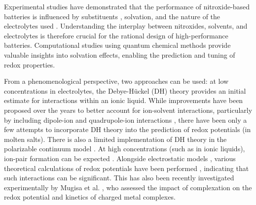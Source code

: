 \documentclass[review,preprint]{elsarticle}
\begin{document}
Experimental studies have demonstrated that the performance of nitroxide-based batteries is influenced by substituents \cite{sugaCathodeAnodeActivePoly2007}, solvation, and the nature of the electrolytes used \cite{armandIonicliquidMaterialsElectrochemical2009,strehmelRadicalsIonicLiquids2012,wylieIncreasedStabilityNitroxide2019b}. Understanding the interplay between nitroxides, solvents, and electrolytes is therefore crucial for the rational design of high-performance batteries. Computational studies using quantum chemical methods provide valuable insights into solvation effects, enabling the prediction and tuning of redox properties.

From a phenomenological perspective, two approaches can be used: at low concentrations in electrolytes, the Debye-Hückel (DH) theory \cite{kontogeorgisDebyeHuckelTheoryIts2018,silvaDerivationsDebyeHuckel2022,silvaImprovingBornEquation2024} provides an initial estimate for interactions within an ionic liquid. While improvements have been proposed over the years to better account for ion-solvent interactions, particularly by including dipole-ion \cite{silvaImprovingBornEquation2024} and quadrupole-ion interactions \cite{slavchovQuadrupoleTermsMaxwell2014,slavchovQuadrupoleTermsMaxwell2014a,coxQuadrupolemediatedDielectricResponse2021}, there have been only a few attempts \cite{matsuiDensityFunctionalTheory2013,xiaoReorganizationEnergyElectron2013,xiaoMolecularDebyeHuckelApproach2014} to incorporate DH theory into the prediction of redox potentials (in molten salts). There is also a limited implementation of DH theory in the polarizable continuum model \cite{cossiInitioStudyIonic1998}. At high concentrations (such as in ionic liquids), ion-pair formation can be expected \cite{marcusIonPairing2006}. Alongside electrostatic models \cite{krishtalikElectrostaticIonSolvent1991,lundDielectricInterpretationSpecificity2010}, various theoretical calculations of redox potentials have been performed \cite{mehtaTheoreticalInvestigationRedox2007,quAccurateModelingEffect2016,taherkhaniInvestigationIonPairs2022}, indicating that such interactions can be significant. This has also been recently investigated experimentally by Mugisa et al. \cite{mugisaEffectIonparingKinetics2024}, who assessed the impact of complexation on the redox potential and kinetics of charged metal complexes.
\end{document}
